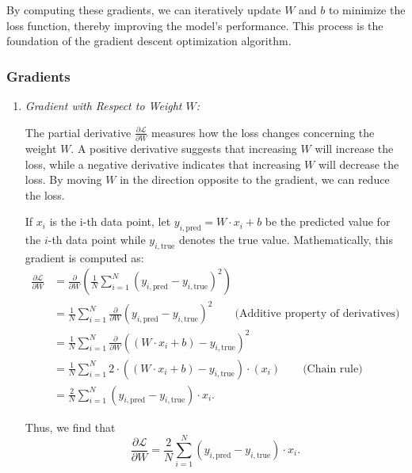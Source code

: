 By computing these gradients, we can iteratively update $W$ and $b$ to minimize the loss function, thereby improving the model's performance. This process is the foundation of the gradient descent optimization algorithm.

\subsubsection{Gradients}
\begin{enumerate}
    \item \textit{Gradient with Respect to Weight $W$:}

    The partial derivative $\frac{\partial \mathcal{L}}{\partial W}$ measures how the loss changes concerning the weight $W$. A positive derivative suggests that increasing $W$ will increase the loss, while a negative derivative indicates that increasing $W$ will decrease the loss. By moving $W$ in the direction opposite to the gradient, we can reduce the loss.

    If $x_i$ is the i-th data point, let $y_{i,\text{pred}} = W \cdot x_i + b$ be the predicted value for the $i$-th data point while $y_{i,\text{true}}$ denotes the true value. Mathematically, this gradient is computed as:
    \begin{align*}
        \frac{\partial \mathcal{L}}{\partial W} &= \frac{\partial}{\partial W}\left( \frac{1}{N}\sum_{i=1}^N(y_{i,\text{pred}} - y_{i,\text{true}})^2\right) \nonumber \\
        & = \frac{1}{N}\sum_{i=1}^N\frac{\partial}{\partial W}(y_{i,\text{pred}} - y_{i,\text{true}})^2 \qquad \text{(Additive property of derivatives)} \nonumber \\
        & = \frac{1}{N}\sum_{i=1}^N\frac{\partial}{\partial W}((W\cdot x_i + b) - y_{i,\text{true}})^2 \nonumber \\
        & = \frac{1}{N}\sum_{i=1}^N 2\cdot((W\cdot x_i + b) - y_{i,\text{true}})\cdot (x_i) \qquad \text{(Chain rule)} \nonumber \\
        & = \frac{2}{N}\sum_{i=1}^N(y_{i,\text{pred}} - y_{i,\text{true}})\cdot x_i.
    \end{align*}

    Thus, we find that 
    \begin{equation}
        \frac{\partial \mathcal{L}}{\partial W} = \frac{2}{N}\sum_{i=1}^N(y_{i,\text{pred}} - y_{i,\text{true}})\cdot x_i.
        \label{eq:gradient_w}
    \end{equation}
    

\end{enumerate}
